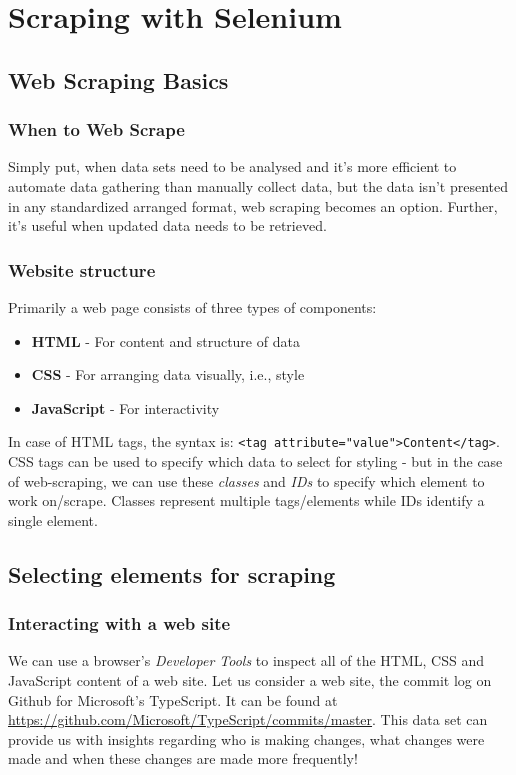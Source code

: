 \chapter{Scraping with Selenium}
\section{Web Scraping Basics}
\subsection{When to Web Scrape}
Simply put, when data sets need to be analysed and it's more efficient to automate data gathering than manually collect data, but the data isn't presented in any standardized arranged format, web scraping becomes an option. Further, it's useful when updated data needs to be retrieved. 

\subsection{Website structure}
Primarily a web page consists of three types of components:

\begin{itemize}
	\item \textbf{HTML} - For content and structure of data
	\item \textbf{CSS} - For arranging data visually, i.e., style
	\item \textbf{JavaScript} - For interactivity
\end{itemize}

In case of HTML tags, the syntax is: \verb|<tag attribute="value">Content</tag>|. CSS tags can be used to specify which data to select for styling - but in the case of web-scraping, we can use these \textit{classes} and \textit{IDs} to specify which element to work on/scrape. Classes represent multiple tags/elements while IDs identify a single element. 

\section{Selecting elements for scraping}
\subsection{Interacting with a web site}
We can use a browser's \textit{Developer Tools} to inspect all of the HTML, CSS and JavaScript content of a web site. Let us consider a web site, the commit log on Github for Microsoft's TypeScript. It can be found at \url{https://github.com/Microsoft/TypeScript/commits/master}. This data set can provide us with insights regarding who is making changes, what changes were made and when these changes are made more frequently! 

